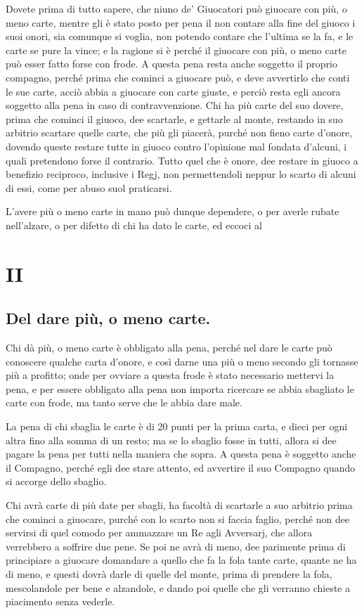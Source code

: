 \documentclass[11pt,a6paper]{article}
\begin{document}
Dovete prima di tutto sapere, che niuno de' Giuocatori può giuocare con più, o meno carte, mentre gli è stato posto per pena il non contare alla fine del giuoco i suoi onori, sia comunque si voglia, non potendo contare che l'ultima se la fa, e le carte se pure la vince; e la ragione si è perché il giuocare con più, o meno carte può esser fatto forse con frode. A questa pena resta anche soggetto il proprio compagno, perché prima che cominci a giuocare può, e deve avvertirlo che conti le sue carte, acciò
abbia a giuocare con carte giuste, e perciò resta egli ancora soggetto alla pena in caso di contravvenzione. Chi ha più carte del suo dovere, prima che cominci il giuoco, dee scartarle, e gettarle al monte, restando in suo arbitrio scartare quelle carte, che più gli piacerà, purché non fieno carte d'onore, dovendo queste restare tutte in giuoco contro l'opinione mal fondata d'alcuni, i quali pretendono forse il contrario. Tutto quel che è onore, dee restare in giuoco a benefizio reciproco, inclusive i Regj, non permettendoli neppur lo scarto di alcuni di essi, come per abuso suol praticarsi.

L'avere più o meno carte in mano può dunque dependere, o per averle rubate nell'alzare, o per difetto di chi ha dato le carte, ed eccoci al

\section{II}
\subsection*{Del dare più, o meno carte.}

Chi
 dà più, o meno carte è obbligato alla pena, perché nel dare le
carte può conoscere qualche carta d'onore, e così darne una più o meno secondo gli tornasse più a profitto; onde per ovviare a questa frode è stato necessario mettervi la pena, e per essere obbligato alla pena non importa ricercare se abbia sbagliato le carte con frode, ma tanto serve che le abbia dare male.

La pena di chi sbaglia le carte è di 20 punti per la prima carta, e dieci per ogni altra fino alla somma di un resto; ma se lo sbaglio fosse in tutti, allora si dee pagare la pena per tutti nella maniera che sopra. A questa pena è soggetto anche il Compagno, perché egli dee stare attento, ed avvertire il suo Compagno quando si accorge dello sbaglio.

Chi avrà carte di più date per sbagli, ha facoltà di scartarle a suo arbitrio prima che cominci a giuocare, purché con lo scarto non si faccia faglio, perché non dee servirsi di quel comodo per ammazzare un Re agli Avversarj, che allora verrebbero a soffrire due pene. Se poi ne avrà di meno, dee parimente prima di principiare a giuocare 
domandare a quello che fa la fola tante 
carte, quante ne ha di meno, e questi 
dovrà darle di quelle del monte, prima
di prendere la fola, mescolandole per bene e alzandole, e dando poi quelle che 
gli verranno chieste a piacimento senza 
vederle. 
\end{document}
